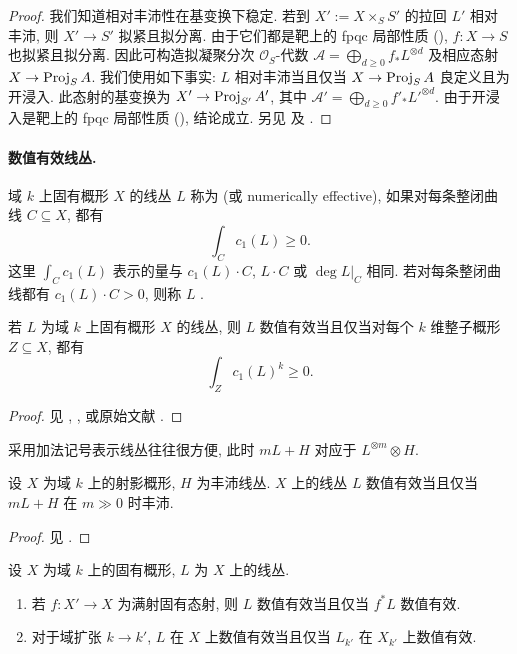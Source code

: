 \begin{proof}
我们知道相对丰沛性在基变换下稳定. 若到 $X':=X\times_S S'$ 的拉回 $L'$ 相对丰沛, 则 $X'\to S'$ 拟紧且拟分离. 由于它们都是靶上的 fpqc 局部性质 (), $f:X\to S$ 也拟紧且拟分离. 因此可构造拟凝聚分次 $\mathcal O_S$-代数 $\mathcal A=\bigoplus_{d\geq0}f_*L^{\otimes d}$ 及相应态射 $X\to\operatorname{Proj}_SA$. 我们使用如下事实: $L$ 相对丰沛当且仅当 $X\to\operatorname{Proj}_SA$ 良定义且为开浸入. 此态射的基变换为 $X'\to\operatorname{Proj}_{S'}A'$, 其中 $\mathcal A'=\bigoplus_{d\geq0}f'_*L'^{\otimes d}$. 由于开浸入是靶上的 fpqc 局部性质 (), 结论成立. 另见 \cite[IV$_2$.$2.7.2$]{EGA} 及 \cite[Tag 0D2P]{SP}.
\end{proof}

\paragraph{数值有效线丛.}
域 $k$ 上固有概形 $X$ 的线丛 $L$ 称为 (或 numerically effective), 如果对每条整闭曲线 $C\subseteq X$, 都有
\[
\int_C c_1(L)\geq0.
\]
这里 $\int_C c_1(L)$ 表示的量与 $c_1(L)\cdot C$, $L\cdot C$ 或 $\deg L|_C$ 相同. 若对每条整闭曲线都有 $c_1(L)\cdot C>0$, 则称 $L$ .
\begin{theorem}[Kleiman 定理]\label{src:B.2.13}
若 $L$ 为域 $k$ 上固有概形 $X$ 的线丛, 则 $L$ 数值有效当且仅当对每个 $k$ 维整子概形 $Z\subseteq X$, 都有
\[
\int_Z c_1(L)^k\geq0.
\]
\end{theorem}
\begin{proof}
见 \cite[定理 $1.4.9$]{Laz04a}, \cite[定理 $2.17$]{Kol96}, 或原始文献 \cite{Kle66}.
\end{proof}
采用加法记号表示线丛往往很方便, 此时 $mL+H$ 对应于 $L^{\otimes m}\otimes H$.
\begin{corollary}[数值有效性的刻画]\label{src:B.2.14}
设 $X$ 为域 $k$ 上的射影概形, $H$ 为丰沛线丛. $X$ 上的线丛 $L$ 数值有效当且仅当 $mL+H$ 在 $m\gg0$ 时丰沛.
\end{corollary}
\begin{proof}
见 \cite[推论 $1.4.10$]{Laz04a}.
\end{proof}
\begin{proposition}[数值有效性的性质]\label{src:B.2.15}
设 $X$ 为域 $k$ 上的固有概形, $L$ 为 $X$ 上的线丛.
\begin{enumerate}[(1)]
\item 若 $f:X'\to X$ 为满射固有态射, 则 $L$ 数值有效当且仅当 $f^*L$ 数值有效.
\item 对于域扩张 $k\to k'$, $L$ 在 $X$ 上数值有效当且仅当 $L_{k'}$ 在 $X_{k'}$ 上数值有效.
\end{enumerate}
\end{proposition}
